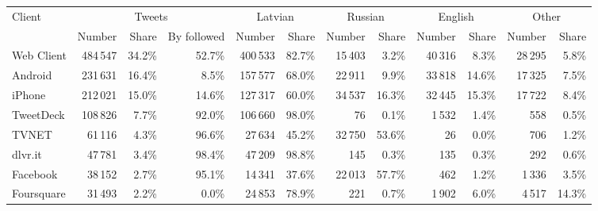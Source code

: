 \begin{tabular}{lrrrrrrrrrrr}
\toprule
\multirow{2}{*}{Client} & \multicolumn{3}{c}{Tweets} & \multicolumn{2}{c}{Latvian} & \multicolumn{2}{c}{Russian} & \multicolumn{2}{c}{English} & \multicolumn{2}{c}{Other} \\
\cmidrule(r){2-4} \cmidrule(r){5-6} \cmidrule(r){7-8} \cmidrule(r){9-10} \cmidrule(r){11-12}
{} & Number & Share & By followed & Number & Share & Number & Share & Number & Share & Number & Share \\
\midrule
Web Client          &      484\,547   &       34.2\% &                52.7\% &            400\,533 &             82.7\% &             15\,403 &              3.2\% &             40\,316 &              8.3\% &            28\,295 &             5.8\% \\
Android             &      231\,631   &       16.4\% &                 8.5\% &            157\,577 &             68.0\% &             22\,911 &              9.9\% &             33\,818 &             14.6\% &            17\,325 &             7.5\% \\
iPhone              &      212\,021   &       15.0\% &                14.6\% &            127\,317 &             60.0\% &             34\,537 &             16.3\% &             32\,445 &             15.3\% &            17\,722 &             8.4\% \\
TweetDeck           &      108\,826   &        7.7\% &                92.0\% &            106\,660 &             98.0\% &                76   &              0.1\% &              1\,532 &              1.4\% &              558   &             0.5\% \\
TVNET               &       61\,116   &        4.3\% &                96.6\% &             27\,634 &             45.2\% &             32\,750 &             53.6\% &                26   &              0.0\% &              706   &             1.2\% \\
dlvr.it             &       47\,781   &        3.4\% &                98.4\% &             47\,209 &             98.8\% &               145   &              0.3\% &               135   &              0.3\% &              292   &             0.6\% \\
Facebook            &       38\,152   &        2.7\% &                95.1\% &             14\,341 &             37.6\% &             22\,013 &             57.7\% &               462   &              1.2\% &             1\,336 &             3.5\% \\
Foursquare          &       31\,493   &        2.2\% &                 0.0\% &             24\,853 &             78.9\% &               221   &              0.7\% &              1\,902 &              6.0\% &             4\,517 &            14.3\% \\

\end{tabular}
